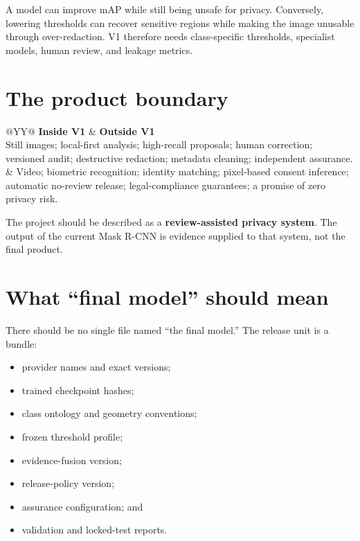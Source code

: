 \begin{warningbox}
A model can improve mAP while still being unsafe for privacy. Conversely, lowering thresholds can recover sensitive regions while making the image unusable through over-redaction. V1 therefore needs class-specific thresholds, specialist models, human review, and leakage metrics.
\end{warningbox}

\section{The product boundary}

\begin{tabularx}{\textwidth}{@{}YY@{}}
\toprule
\textbf{Inside V1} & \textbf{Outside V1} \\
\midrule
Still images; local-first analysis; high-recall proposals; human correction; versioned audit; destructive redaction; metadata cleaning; independent assurance. & Video; biometric recognition; identity matching; pixel-based consent inference; automatic no-review release; legal-compliance guarantees; a promise of zero privacy risk. \\
\bottomrule
\end{tabularx}

The project should be described as a \textbf{review-assisted privacy system}. The output of the current Mask R-CNN is evidence supplied to that system, not the final product.

\section{What ``final model'' should mean}

There should be no single file named ``the final model.'' The release unit is a bundle:

\begin{itemize}[leftmargin=6mm]
  \item provider names and exact versions;
  \item trained checkpoint hashes;
  \item class ontology and geometry conventions;
  \item frozen threshold profile;
  \item evidence-fusion version;
  \item release-policy version;
  \item assurance configuration; and
  \item validation and locked-test reports.
\end{itemize}

